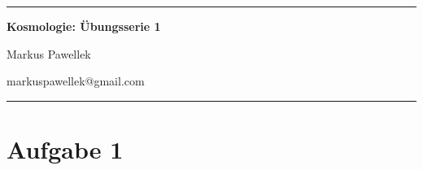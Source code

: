 \documentclass[a4paper,fleqn,10pt]{article}
\begin{document}
  \hrule
  \medskip
  \begin{center}
    \Large
    \textbf{Kosmologie: Übungsserie 1}
  \end{center}
  \medskip
  \begin{minipage}[t]{0.45\textwidth}
    Markus Pawellek
  \end{minipage}
  \hfill
  \begin{minipage}[t]{0.45\textwidth}
    \begin{raggedleft}
      markuspawellek@gmail.com\\
    \end{raggedleft}
  \end{minipage}
  \medskip
  \hrule
  \bigskip

  \section*{Aufgabe 1} %
\end{document}
